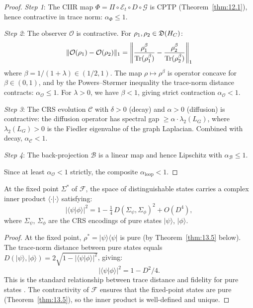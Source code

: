 \begin{proof}
\emph{Step 1}: The CIIR map $\Phi = \Pi \circ \mathcal{E}_t \circ D \circ
\mathcal{G}$ is CPTP (Theorem~\ref{thm:12.1}), hence contractive in
trace norm: $\alpha_\Phi \leq 1$.

\emph{Step 2}: The observer $\mathcal{O}$ is contractive.
For $\rho_1, \rho_2 \in \mathfrak{D}(H_C)$:
\[
  \|\mathcal{O}(\rho_1) - \mathcal{O}(\rho_2)\|_1
  = \left\|\frac{\rho_1^{\beta}}{\mathrm{Tr}(\rho_1^{\beta})}
  - \frac{\rho_2^{\beta}}{\mathrm{Tr}(\rho_2^{\beta})}\right\|_1
\]
where $\beta = 1/(1+\lambda) \in (1/2, 1)$.  The map $\rho \mapsto
\rho^{\beta}$ is operator concave for $\beta \in (0,1)$, and by
the Powers--St{\o}rmer inequality the trace-norm distance contracts:
$\alpha_{\mathcal{O}} \leq 1$.  For $\lambda > 0$, we have
$\beta < 1$, giving strict contraction $\alpha_{\mathcal{O}} < 1$.

\emph{Step 3}: The CRS evolution $\mathcal{C}$ with $\delta > 0$
(decay) and $\alpha > 0$ (diffusion) is contractive:
the diffusion operator has spectral gap $\geq \alpha \cdot \lambda_2(L_G)$,
where $\lambda_2(L_G) > 0$ is the Fiedler eigenvalue of the graph
Laplacian.  Combined with decay, $\alpha_{\mathcal{C}} < 1$.

\emph{Step 4}: The back-projection $\mathcal{B}$ is a linear map and
hence Lipschitz with $\alpha_{\mathcal{B}} \leq 1$.

Since at least $\alpha_{\mathcal{O}} < 1$ strictly, the composite
$\alpha_{\mathrm{loop}} < 1$.
\end{proof}

\begin{theorem}\label{thm:13.3}
At the fixed point $\Sigma^*$ of $\mathcal{F}$, the space of
distinguishable states carries a complex inner product $\langle \cdot |
\cdot \rangle$ satisfying:
\begin{equation}\label{eq:inner-prod}
  |\langle \psi | \phi \rangle|^2
  = 1 - \tfrac{1}{4}\,D(\Sigma_\psi, \Sigma_\phi)^2
  + O(D^4),
\end{equation}
where $\Sigma_\psi$, $\Sigma_\phi$ are the CRS encodings of pure states
$|\psi\rangle$, $|\phi\rangle$.
\end{theorem}

\begin{proof}
At the fixed point, $\rho^* = |\psi\rangle\langle\psi|$ is pure
(by Theorem~\ref{thm:13.5} below).  The trace-norm distance between
pure states equals $D(|\psi\rangle, |\phi\rangle) = 2\sqrt{1 -
|\langle\psi|\phi\rangle|^2}$, giving:
\[
  |\langle\psi|\phi\rangle|^2 = 1 - D^2/4.
\]
This is the standard relationship between trace distance and fidelity
for pure states \cite{NielsenChuang2000}.  The contractivity of
$\mathcal{F}$ ensures that the fixed-point states are pure
(Theorem~\ref{thm:13.5}), so the inner product is well-defined and
unique.
\end{proof}

